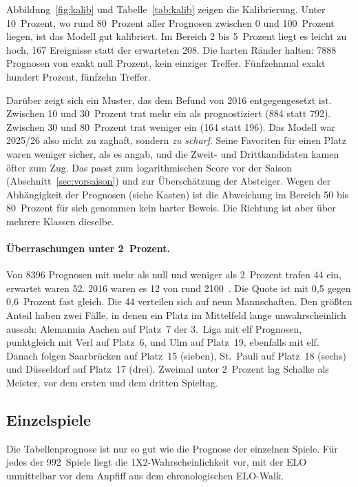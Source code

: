 \documentclass[11pt,a4paper,parskip=half,numbers=noenddot]{scrartcl}
\newcommand{\abb}[1]{Abbildung~\ref{#1}}
\newcommand{\tab}[1]{Tabelle~\ref{#1}}
\begin{document}
\abb{fig:kalib} und \tab{tab:kalib} zeigen die Kalibrierung. Unter
10~Prozent, wo rund 80~Prozent aller Prognosen zwischen 0 und 100~Prozent
liegen, ist das Modell gut
kalibriert. Im Bereich 2 bis 5~Prozent liegt es leicht zu hoch, 167
Ereignisse statt der erwarteten 208. Die harten Ränder halten: \num{7888}
Prognosen von exakt null Prozent, kein einziger Treffer. Fünfzehnmal exakt
hundert Prozent, fünfzehn Treffer.

Darüber zeigt sich ein Muster, das dem Befund von 2016 entgegengesetzt ist.
Zwischen 10 und 30~Prozent trat mehr ein als prognostiziert (884 statt 792).
Zwischen 30 und 80~Prozent trat weniger ein (164 statt 196). Das Modell war
2025/26 also nicht zu zaghaft, sondern \emph{zu scharf}. Seine Favoriten
für einen Platz waren weniger sicher, als es angab, und die
Zweit- und Drittkandidaten kamen öfter zum Zug. Das passt zum logarithmischen
Score vor der Saison (Abschnitt~\ref{sec:vorsaison}) und zur Überschätzung der
Absteiger. Wegen der Abhängigkeit der Prognosen (siehe Kasten) ist die
Abweichung im Bereich 50 bis 80~Prozent für sich genommen kein harter
Beweis. Die Richtung ist aber über mehrere Klassen dieselbe.

\paragraph{Überraschungen unter 2~Prozent.} Von \num{8396} Prognosen mit
mehr als null und weniger als 2~Prozent trafen 44 ein, erwartet waren
52. 2016 waren es 12 von rund \num{2100}~\cite{30punkte2016}. Die Quote
ist mit 0,5 gegen 0,6~Prozent fast gleich. Die 44 verteilen sich auf neun
Mannschaften. Den größten Anteil haben zwei Fälle, in denen ein Platz im
Mittelfeld lange unwahrscheinlich aussah: Alemannia Aachen auf Platz~7 der
3.~Liga mit elf Prognosen, punktgleich mit Verl auf Platz~6, und Ulm auf
Platz~19, ebenfalls mit elf. Danach folgen Saarbrücken auf Platz~15
(sieben), St.~Pauli auf Platz~18 (sechs) und Düsseldorf auf Platz~17
(drei). Zweimal unter 2~Prozent lag Schalke als Meister, vor dem ersten und
dem dritten Spieltag.

\subsection{Einzelspiele}\label{sec:spiele}

Die Tabellenprognose ist nur so gut wie die Prognose der einzelnen Spiele.
Für jedes der 992~Spiele liegt die 1X2-Wahrscheinlichkeit vor, mit der ELO
unmittelbar vor dem Anpfiff aus dem chronologischen ELO-Walk.
\end{document}
